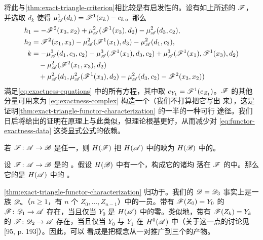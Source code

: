 将此与\cref{thm:exact-triangle-criterion}相比较是有启发性的。设有如上所述的%
\trAFunctor{} $\mathscr{F}$，并选取 $d_k$ 使得
$\mu^1_{\mathscr{A}}(d_k)=\mathscr{F}^1(x_k)-c_k$。那么
\begin{equation}\label{eq:functor-exactness-data}
\begin{aligned}
h_1&=-\mathscr{F}^2(x_3,x_2)+\mu^2_{\mathscr{A}}(\mathscr{F}^1(x_3),d_2)
-\mu^2_{\mathscr{A}}(d_3,c_2),\\
h_2&=\mathscr{F}^2(x_1,x_3)-\mu^2_{\mathscr{A}}(\mathscr{F}^1(x_1),d_3)
-\mu^2_{\mathscr{A}}(d_1,c_3),\\
k&=-\mu^3_{\mathscr{A}}(d_1,c_3,c_2)-\mu^3_{\mathscr{A}}(\mathscr{F}^1(x_1),d_3,c_2)
+\mu^3_{\mathscr{A}}(\mathscr{F}^1(x_1),\mathscr{F}^1(x_3),d_2)\\
&\quad-\mu^2_{\mathscr{A}}(\mathscr{F}^2(x_1,x_3),d_2)\\
&\quad+\mu^2_{\mathscr{A}}(d_1,\mu^2_{\mathscr{A}}(\mathscr{F}^1(x_3),d_2)
-\mu^2_{\mathscr{A}}(d_3,c_2)-\mathscr{F}^2(x_3,x_2))
\end{aligned}
\end{equation}
满足\eqref{eq:exactness-equations} 中的所有方程，其中取
$e_{Y_1}=\mathscr{F}^1(e_{Z_1})$。$\mathscr{F}$ 的其他分量可用来为\trComplex{}
\eqref{eq:exactness-complex} 构造一个\trContractingHomotopy（我们不打算把它写出
来），这是证明\cref{thm:exact-triangle-functor-characterization} 的一半的一种可行
途径。我们日后将给出的证明在原理上与此类似，但理论根基更好，从而减少对
\eqref{eq:functor-exactness-data} 这类显式公式的依赖。

\begin{corollary}\label{thm:afunctor-maps-exact-triangles}
若 $\mathscr{F}\colon\mathscr{A}\to\mathscr{B}$ 是任一\trAFunctor，则 $H(\mathscr{F})$ 把
$H(\mathscr{A})$ 中的\trExactTriangle{}映为 $H(\mathscr{B})$ 中的\trExactTriangle。
\end{corollary}

\begin{corollary}\label{thm:preimage-exact-triangle}
设 $\mathscr{F}\colon\mathscr{A}\to\mathscr{B}$ 是\trCohomology\trFullyFaithful{}的%
\trAFunctor。假设 $H(\mathscr{B})$ 中有一个\trExactTriangle，构成它的诸\trObject{}均
落在 $\mathscr{F}$ 的\trImage{}中。那么它的\trPreimage{}是 $H(\mathscr{A})$ 中的%
\trExactTriangle。
\end{corollary}

\begin{remark}\label{thm:kontsevich-dn-family}
\cref{thm:exact-triangle-functor-characterization} 归功于\trKontsevich。我们的
$\mathscr{D}=\mathscr{D}_3$ 事实上是一族 \trACategory{} $\mathscr{D}_n$（$n\ge 1$，有 $n$ 个%
\trObject{} $Z_0,\ldots,Z_{n-1}$）中的一员。带有 $\mathscr{F}(Z_0)=Y_0$ 的%
\trAFunctor{} $\mathscr{F}\colon\mathscr{D}_1\to\mathscr{A}$ 存在，当且仅当 $Y_0$ 是
$H(\mathscr{A})$ 中的零\trObject。类似地，带有 $\mathscr{F}(Z_k)=Y_k$ 的
$\mathscr{F}\colon\mathscr{D}_2\to\mathscr{A}$ 存在，当且仅当 $Y_0$ 与 $Y_1$ 在 $H^0(\mathscr{A})$
中\trIsomorphic（关于这一点的讨论见 [95, p. 193]）。因此，\trExactTriangle{}可以
看成是把\trIsomorphism{}概念从一对\trObject{}推广到三个\trObject{}的产物。
\end{remark}

